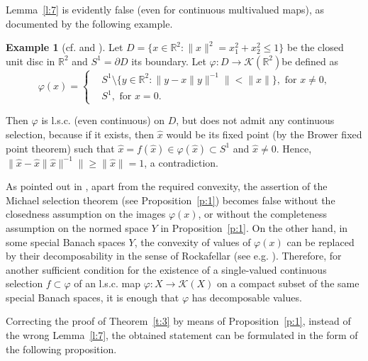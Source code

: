 \documentclass[12pt]{amsart}
\theoremstyle{definition}
\newtheorem{example}{Example}
\newcommand\R{\mathbb{R}}
\newcommand{\KK}{\mathcal K}
\newcommand{\vp}{\varphi}
\begin{document}
Lemma~\ref{l:7} is evidently false (even for continuous multivalued maps), as documented by the following example.

\begin{example}[cf. {\cite[Example 2.10]{ATDZ}} and {\cite[Example 1.4.4]{HP}}]
Let  $D = \{x\in\R^2: \|x\|^2 = x_1^2+x_2^2 \leq 1\}$ be the closed unit disc in $\R^2$ and $S^1 = \partial D$ its boundary. Let $\vp:D\to\KK(\R^2)$be defined as
\[
\vp(x)=
\begin{cases}
&S^1\setminus\{y\in\R^2: \|y-x\|y\|^{-1}\| <\|x\|\}, \mbox{ for $x\neq 0$,}\\
&S^1, \mbox{ for $x=0$.}
\end{cases}
\]

Then $\vp$ is l.s.c. (even continuous) on $D$, but does not admit any continuous selection, because if it exists, then $\hat{x}$ would be its fixed point (by the Brower fixed point theorem) such that  $\hat{x} = f(\hat{x})\in \vp(\hat{x}) \subset S^1$ and $\hat{x}\neq 0$. Hence, $\|\hat{x} - \hat{x}\|\hat{x}\|^{-1}\|\geq \|\hat{x}\| = 1$, a contradiction.
\end{example}

As pointed out in \cite[p. 14]{ATDZ}, apart from the required convexity, the assertion of the Michael selection theorem (see Proposition~\ref{p:1}) becomes false without the closedness assumption on the images $\vp(x)$, or without the completeness assumption on the normed space $Y$ in Proposition~\ref{p:1}. On the other hand, in some special Banach spaces $Y$, the convexity of values of $\vp(x)$ can be replaced by their decomposability in the sense of Rockafellar (see e.g. \cite{Fr}). Therefore, for another sufficient condition for the existence of a single-valued continuous selection $f\subset\vp$ of an l.s.c. map $\vp:X\to\KK(X)$ on a compact subset of the same special Banach spaces, it is enough that $\vp$ has decomposable values.

Correcting the proof of Theorem~\ref{t:3} by means of Proposition~\ref{p:1}, instead of the wrong Lemma~\ref{l:7}, the obtained statement can be formulated in the form of the following proposition.
\end{document}

